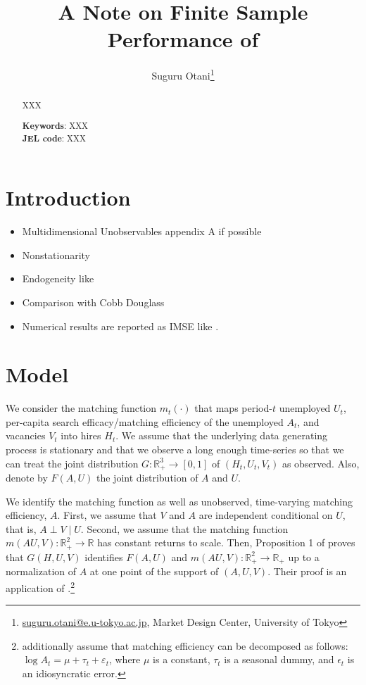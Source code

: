 \documentclass[12pt]{article}
\begin{document}
\title{A Note on Finite Sample Performance of \cite{lange2020beyond}}
\author{Suguru Otani\thanks{\href{mailto:}{suguru.otani@e.u-tokyo.ac.jp}, Market Design Center, University of Tokyo}}
\maketitle

\begin{abstract}
\noindent
XXX

\textbf{Keywords}: XXX \\
\textbf{JEL code}: XXX
\end{abstract}

\section{Introduction}

\begin{itemize}
    \item Multidimensional Unobservables \cite{matzkin2003nonparametric} appendix A if possible
    \item Nonstationarity
    \item Endogeneity like \cite{borowczyk2013accounting}
    \item Comparison with Cobb Douglass
    \item Numerical results are reported as IMSE like \cite{matzkin2003nonparametric}.
\end{itemize}

\section{Model}
We consider the matching function $m_t(\cdot)$ that maps period-$t$ unemployed $U_t$, per-capita search efficacy/matching efficiency of the unemployed $A_t$, and vacancies $V_t$ into hires $H_t$.
We assume that the underlying data generating process is stationary and that we observe a long enough time-series so that we can treat the joint distribution $G: \mathbb{R}_{+}^3 \rightarrow[0,1]$ of $\left(H_t, U_t, V_t\right)$ as observed. 
Also, denote by $F(A, U)$ the joint distribution of $A$ and $U$.

We identify the matching function as well as unobserved, time-varying matching efficiency, $A .$ 
First, we assume that $V$ and $A$ are independent conditional on $U$, that is, $A \perp V \mid U$. 
Second, we assume that the matching function $m(AU,V):\mathbb{R}_{+}^2 \rightarrow \mathbb{R}$ has constant returns to scale. 
Then, Proposition 1 of \cite{lange2020beyond} proves that $G(H, U, V)$ identifies $F(A, U)$ and $m(A U, V): \mathbb{R}_{+}^2 \rightarrow \mathbb{R}_{+}$ up to a normalization of $A$ at one point of the support of $(A, U, V)$. Their proof is an application of \cite{matzkin2003nonparametric}.\footnote{\cite{borowczyk2013accounting} additionally assume that matching efficiency can be decomposed as follows: $\log A_{t}=\mu + \tau_{t} + \varepsilon_{t}$, where $\mu$ is a constant, $\tau_t$ is a seasonal dummy, and $\epsilon_t$ is an idiosyncratic error.}
\end{document}
